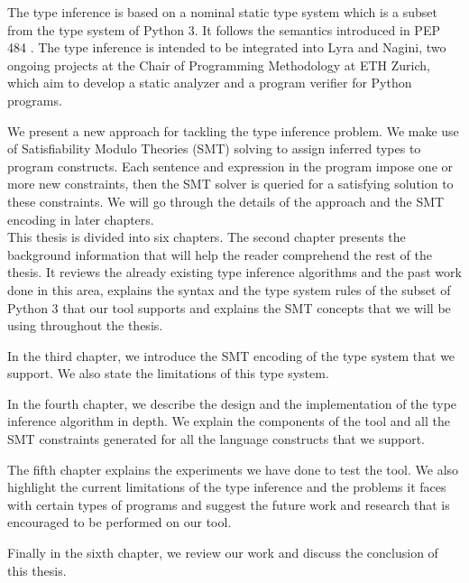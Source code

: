 The type inference is based on a nominal static type system which is a subset from the type system of Python 3. It follows the semantics introduced in PEP 484 \cite{484}. The type inference is intended to be integrated into Lyra and Nagini, two ongoing projects at the Chair of Programming Methodology at ETH Zurich, which aim to develop a static analyzer and a program verifier for Python programs.

We present a new approach for tackling the type inference problem. We make use of Satisfiability Modulo Theories (SMT) solving to assign inferred types to program constructs. Each sentence and expression in the program impose one or more new constraints, then the SMT solver is queried for a satisfying solution to these constraints. We will go through the details of the approach and the SMT encoding in later chapters.\\
 
This thesis is divided into six chapters. The second chapter presents the background information that will help the reader comprehend the rest of the thesis. It reviews the already existing type inference algorithms and the past work done in this area, explains the syntax and the type system rules of the subset of Python 3 that our tool supports and explains the SMT concepts that we will be using throughout the thesis.

In the third chapter, we introduce the SMT encoding of the type system that we support. We also state the limitations of this type system.

In the fourth chapter, we describe the design and the implementation of the type inference algorithm in depth. We explain the components of the tool and all the SMT constraints generated for all the language constructs that we support.

The fifth chapter explains the experiments we have done to test the tool. We also highlight the current limitations of the type inference and the problems it faces with certain types of programs and suggest the future work and research that is encouraged to be performed on our tool.

Finally in the sixth chapter, we review our work and discuss the conclusion of this thesis.